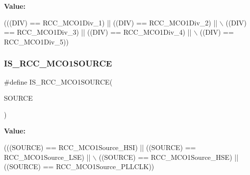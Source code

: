 {\bfseries Value\+:}
\begin{DoxyCode}
(((DIV) == RCC\_MCO1Div\_1) || ((DIV) == RCC\_MCO1Div\_2) || \(\backslash\)
                             ((DIV) == RCC\_MCO1Div\_3) || ((DIV) == RCC\_MCO1Div\_4) || \(\backslash\)
                             ((DIV) == RCC\_MCO1Div\_5))
\end{DoxyCode}
\mbox{\label{group___r_c_c___m_c_o1___clock___source___prescaler_ga073031d9c90c555f7874912b7e4905f6}} 
\subsubsection{\texorpdfstring{I\+S\+\_\+\+R\+C\+C\+\_\+\+M\+C\+O1\+S\+O\+U\+R\+CE}{IS\_RCC\_MCO1SOURCE}}
{\footnotesize\ttfamily \#define I\+S\+\_\+\+R\+C\+C\+\_\+\+M\+C\+O1\+S\+O\+U\+R\+CE(\begin{DoxyParamCaption}\item[{}]{S\+O\+U\+R\+CE }\end{DoxyParamCaption})}

{\bfseries Value\+:}
\begin{DoxyCode}
(((SOURCE) == RCC\_MCO1Source\_HSI) || ((SOURCE) == RCC\_MCO1Source\_LSE) || \(\backslash\)
                                   ((SOURCE) == RCC\_MCO1Source\_HSE) || ((SOURCE) == RCC\_MCO1Source\_PLLCLK))
\end{DoxyCode}
